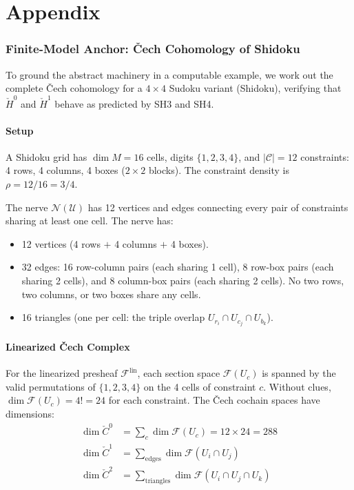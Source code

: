 \documentclass[11pt,letterpaper]{article}
\newcommand{\Cech}{\check{C}}
\newcommand{\Hcech}{\check{H}}
\newcommand{\sheaf}{\mathcal{F}}
\newcommand{\cover}{\mathcal{U}}
\newcommand{\nerve}{\mathcal{N}}
\newcommand{\constraint}{\mathcal{C}}
\begin{document}
\newpage
\appendix
\part*{Appendix}

\section{Finite-Model Anchor: \v{C}ech Cohomology of 
Shidoku}\label{app:shidoku}

To ground the abstract machinery in a computable example, we work out 
the complete \v{C}ech cohomology for a $4 \times 4$ Sudoku variant 
(Shidoku), verifying that $\Hcech^0$ and $\Hcech^1$ behave as 
predicted by SH3 and SH4.

\subsection{Setup}

A Shidoku grid has $\dim M = 16$ cells, digits $\{1,2,3,4\}$, and 
$|\constraint| = 12$ constraints: 4 rows, 4 columns, 4 boxes 
($2 \times 2$ blocks). The constraint density is 
$\rho = 12/16 = 3/4$.

The nerve $\nerve(\cover)$ has 12 vertices and edges connecting 
every pair of constraints sharing at least one cell. The nerve has:
\begin{itemize}
    \item 12 vertices (4 rows $+$ 4 columns $+$ 4 boxes).
    \item 32 edges: 16 row-column pairs (each sharing 1 cell), 
    8 row-box pairs (each sharing 2 cells), and 8 column-box pairs 
    (each sharing 2 cells). No two rows, two columns, or two boxes 
    share any cells.
    \item 16 triangles (one per cell: the triple overlap 
    $U_{r_i} \cap U_{c_j} \cap U_{b_k}$).
\end{itemize}

\subsection{Linearized \v{C}ech Complex}

For the linearized presheaf $\sheaf^{\mathrm{lin}}$, each section 
space $\sheaf(U_c)$ is spanned by the valid permutations of 
$\{1,2,3,4\}$ on the 4 cells of constraint $c$. Without clues, 
$\dim \sheaf(U_c) = 4! = 24$ for each constraint. The \v{C}ech 
cochain spaces have dimensions:
\begin{align}
    \dim \Cech^0 &= \sum_{c} \dim \sheaf(U_c) = 12 \times 24 = 288 \\
    \dim \Cech^1 &= \sum_{\text{edges}} \dim \sheaf(U_i \cap U_j) \\
    \dim \Cech^2 &= \sum_{\text{triangles}} \dim \sheaf(U_i \cap U_j 
    \cap U_k)
\end{align}
\end{document}
